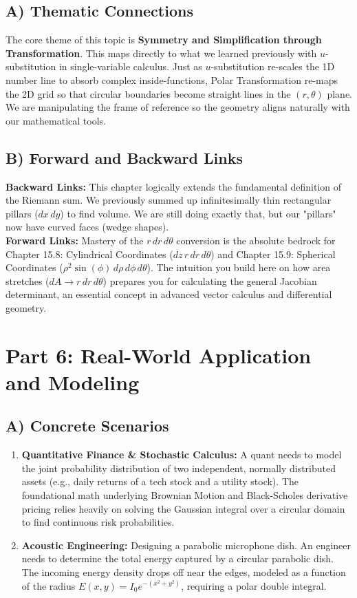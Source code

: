 \documentclass[12pt]{article}
\begin{document}
\subsection{A) Thematic Connections}
The core theme of this topic is \textbf{Symmetry and Simplification through Transformation}. This maps directly to what we learned previously with $u$-substitution in single-variable calculus. Just as $u$-substitution re-scales the 1D number line to absorb complex inside-functions, Polar Transformation re-maps the 2D grid so that circular boundaries become straight lines in the $(r, \theta)$ plane. We are manipulating the frame of reference so the geometry aligns naturally with our mathematical tools.

\subsection{B) Forward and Backward Links}
\textbf{Backward Links:} This chapter logically extends the fundamental definition of the Riemann sum. We previously summed up infinitesimally thin rectangular pillars ($dx \, dy$) to find volume. We are still doing exactly that, but our "pillars" now have curved faces (wedge shapes). \\
\textbf{Forward Links:} Mastery of the $r \, dr \, d\theta$ conversion is the absolute bedrock for Chapter 15.8: Cylindrical Coordinates ($dz \, r \, dr \, d\theta$) and Chapter 15.9: Spherical Coordinates ($\rho^2 \sin(\phi) \, d\rho \, d\phi \, d\theta$). The intuition you build here on how area stretches ($dA \to r \, dr \, d\theta$) prepares you for calculating the general Jacobian determinant, an essential concept in advanced vector calculus and differential geometry.

\newpage
\section{Part 6: Real-World Application and Modeling}

\subsection{A) Concrete Scenarios}
\begin{enumerate}
    \item \textbf{Quantitative Finance \& Stochastic Calculus:} A quant needs to model the joint probability distribution of two independent, normally distributed assets (e.g., daily returns of a tech stock and a utility stock). The foundational math underlying Brownian Motion and Black-Scholes derivative pricing relies heavily on solving the Gaussian integral over a circular domain to find continuous risk probabilities.
    \item \textbf{Acoustic Engineering:} Designing a parabolic microphone dish. An engineer needs to determine the total energy captured by a circular parabolic dish. The incoming energy density drops off near the edges, modeled as a function of the radius $E(x,y) = I_0 e^{-(x^2+y^2)}$, requiring a polar double integral.
\end{enumerate}
\end{document}
